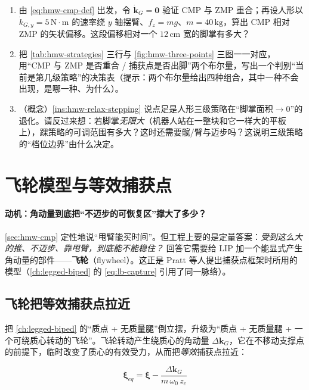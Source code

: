\begin{practice}
\begin{enumerate}
  \item 由 \cref{eq:hmw-cmp-def} 出发，令 $\dot{\mathbf k}_G=\mathbf 0$ 验证 CMP 与 ZMP 重合；再设人形以 $\dot k_{G,y}=5\,\mathrm{N\!\cdot\!m}$ 的速率绕 $y$ 轴摆臂、$f_z=mg$、$m=40\,\mathrm{kg}$，算出 CMP 相对 ZMP 的矢状偏移。这段偏移相对一个 $12\,\mathrm{cm}$ 宽的脚掌有多大？
  \item 把 \cref{tab:hmw-strategies} 三行与 \cref{fig:hmw-three-points} 三图一一对应，用“CMP 与 ZMP 是否重合 / 捕获点是否出脚”两个布尔量，写出一个判别“当前是第几级策略”的决策表（提示：两个布尔量给出四种组合，其中一种不会出现，是哪一种、为什么）。
  \item （概念）\cref{ins:hmw-relax-stepping} 说点足是人形三级策略在“脚掌面积$\to 0$”的退化。请反过来想：若脚掌\emph{无限大}（机器人站在一整块和它一样大的平板上），踝策略的可调范围有多大？这时还需要髋/臂与迈步吗？这说明三级策略的“档位边界”由什么决定。
\end{enumerate}
\end{practice}

\section{飞轮模型与等效捕获点}
\label{sec:hmw-flywheel}

\paragraph{动机：角动量到底把“不迈步的可恢复区”撑大了多少？}
\cref{sec:hmw-cmp} 定性地说“甩臂能买时间”。但工程上要的是定量答案：\emph{受到这么大的推、不迈步、靠甩臂，到底能不能稳住？} 回答它需要给 LIP 加一个能显式产生角动量的部件——\textbf{飞轮}（flywheel）。这正是 Pratt 等人提出捕获点框架时所用的模型（\cref{ch:legged-biped} 的 \cref{eq:lb-capture} 引用了同一脉络）。

\subsection{飞轮把等效捕获点拉近}
\label{subsec:hmw-flywheel-eq}

把 \cref{ch:legged-biped} 的“质点 + 无质量腿”倒立摆，升级为“质点 + 无质量腿 + 一个可绕质心转动的飞轮”。飞轮转动产生绕质心的角动量 $\Delta\mathbf k_G$，它在不移动支撑点的前提下，临时改变了质心的有效受力，从而把\emph{等效}捕获点拉近：

\begin{equation}
  \boxed{\;\boldsymbol\xi_{eq}=\boldsymbol\xi-\frac{\Delta\mathbf k_G}{m\,\omega_0\,z_c}\;}
  \label{eq:hmw-flywheel-xi}
\end{equation}

